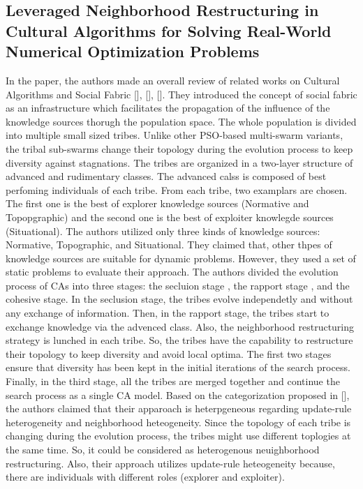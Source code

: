 \subsection{Leveraged Neighborhood Restructuring in Cultural Algorithms for Solving Real-World Numerical Optimization Problems}
In the paper, the authors made an overall review of related works on Cultural Algorithms and Social Fabric [], [], []. They introduced the concept of social fabric as an infrastructure which facilitates the propagation of the influence of the knowledge sources thorugh the population space. The whole population is divided into multiple small sized tribes. Unlike other PSO-based multi-swarm variants, the tribal sub-swarms change their topology during the evolution process to keep diversity against stagnations.\newline
The tribes are organized in a two-layer structure of advanced and rudimentary classes. The advanced calss is composed of best perfoming individuals of each tribe. From each tribe, two examplars are chosen. The first one is the best of explorer knowledge sources (Normative and Topopgraphic) and the second one is the best of exploiter knowlegde sources (Situational). The authors utilized only three kinds of knowledge sources: Normative, Topographic, and Situational. They claimed that, other thpes of knowledge sources are suitable for dynamic problems. However, they used a set of static problems to evaluate their approach. The authors divided the evolution process of CAs into three stages: the secluion stage , the rapport stage , and the cohesive stage. In the seclusion stage, the tribes evolve independetly and without any exchange of information. Then, in the rapport stage, the tribes start to exchange knowledge via the advenced class. Also, the neighborhood restructuring strategy is lunched in each tribe. So, the tribes have the capability to restructure their topology to keep diversity and avoid local optima. The first two stages ensure that diversity has been kept in the initial iterations of the search process. Finally, in the third stage, all the tribes are merged together and continue the search process as a single CA model. \newline
Based on the categorization proposed in [], the authors claimed that their apparoach is heterpgeneous regarding update-rule heterogeneity and neighborhood heteogeneity. Since the topology of each tribe is changing during the evolution process, the tribes might use different toplogies at the same time. So, it could be considered as heterogenous neuighborhood restructuring. Also, their approach utilizes update-rule heteogeneity because, there are individuals with different roles (explorer and exploiter). \newline
